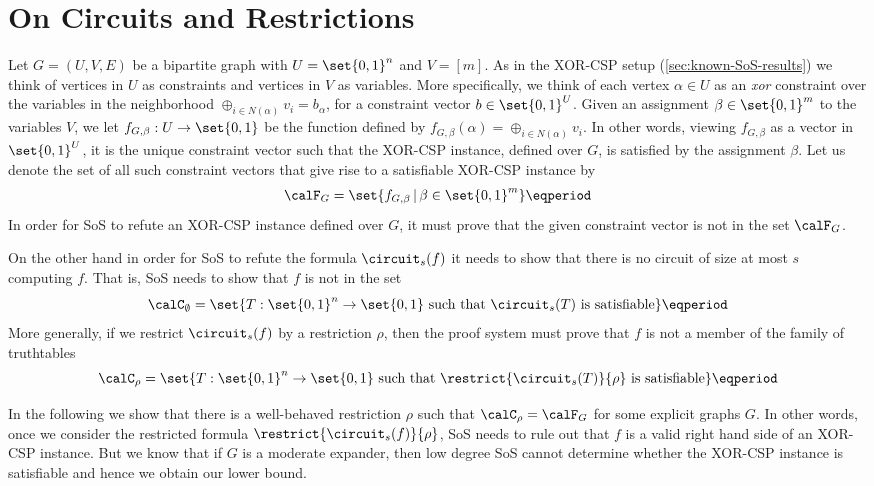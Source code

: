 \section{On Circuits and Restrictions}
\label{sec:circ-rest}

Let $G=(U, V, E)$ be a bipartite graph with $U = \set{0,1}^n$ and
$V = [m]$. As in the XOR-CSP setup (\cref{sec:known-SoS-results}) we
think of vertices in $U$ as constraints and vertices in $V$ as
variables. More specifically, we think of each vertex $\alpha \in U$
as an \emph{xor} constraint over the variables in the neighborhood
$\oplus_{i \in N(\alpha)} v_i = b_\alpha$, for a constraint vector
$b \in \set{0,1}^U$. Given an assignment $\beta \in \set{0,1}^m$ to
the variables $V$, we let $f_{G, \beta}: U \rightarrow \set{0,1}$ be
the function defined by
$f_{G, \beta}(\alpha) = \oplus_{i \in N(\alpha)} v_i$.  In other
words, viewing $f_{G,\beta}$ as a vector in $\set{0,1}^U$, it is the
unique constraint vector such that the XOR-CSP instance, defined over
$G$, is satisfied by the assignment $\beta$. Let us denote the set of
all such constraint vectors that give rise to a satisfiable XOR-CSP
instance by
\[
  \calF_G = \set{f_{G, \beta} \,|\, \beta \in \set{0,1}^m} \eqperiod
\]
In order for SoS to refute an XOR-CSP instance defined over $G$,
it must prove that the given constraint vector is not in the set
$\calF_G$.

On the other hand in order for SoS to refute the formula $\circuit_s(f)$
it needs to show that there is no circuit of size at most $s$
computing $f$. That is, SoS needs to show that $f$ is not in the set
\[
  \calC_{\emptyset} =
  \set{
    T:
    \set{0,1}^n \rightarrow \set{0,1}
    \text{~such that~}
    \circuit_s(T)
    \text{~is satisfiable}
  } \eqperiod
\]
More generally, if we restrict $\circuit_s(f)$ by a restriction
$\rho$, then the proof system must prove that $f$ is not a member
of the family of truthtables
\[
  \calC_\rho =
  \set{
    T:
    \set{0,1}^n \rightarrow \set{0,1}
    \text{~such that~}
    \restrict{\circuit_s(T)}{\rho}
    \text{~is satisfiable}
  } \eqperiod
\]

In the following we show that there is a well-behaved restriction
$\rho$ such that $\calC_\rho = \calF_G$ for some explicit graphs
$G$. In other words, once we consider the restricted formula
$\restrict{\circuit_s(f)}{\rho}$, SoS needs to rule
out that $f$ is a valid right hand side of an XOR-CSP instance. But we
know that if $G$ is a moderate expander, then low degree SoS cannot
determine whether the XOR-CSP instance is satisfiable and hence we
obtain our lower bound.

